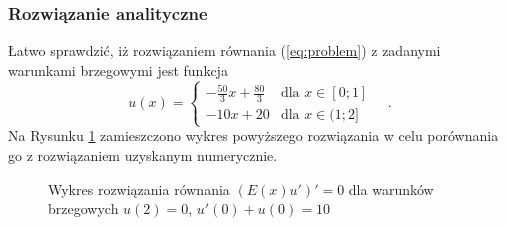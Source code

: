 \documentclass{myclass}
\begin{document}
\subsubsection*{Rozwiązanie analityczne}
Łatwo sprawdzić, iż rozwiązaniem równania (\ref{eq:problem}) z zadanymi
warunkami brzegowymi jest funkcja
\begin{equation}
    u(x) = \begin{cases}
        -\frac{50}{3} x + \frac{80}{3}&\text{dla \(x\in[0;1]\)}\\
        -10 x + 20&\text{dla \(x\in(1;2]\)}
    \end{cases}\quad.
\end{equation}
Na Rysunku \ref{fig:1} zamieszczono wykres powyższego rozwiązania w celu porównania go z rozwiązaniem uzyskanym numerycznie.
\begin{figure}[ht]
    \centering

    \caption{Wykres rozwiązania równania \((E(x)u')'=0\) dla warunków brzegowych \(u(2)=0\), \(u'(0)+u(0)=10\)}

    \label{fig:1}
\end{figure}
\end{document}
